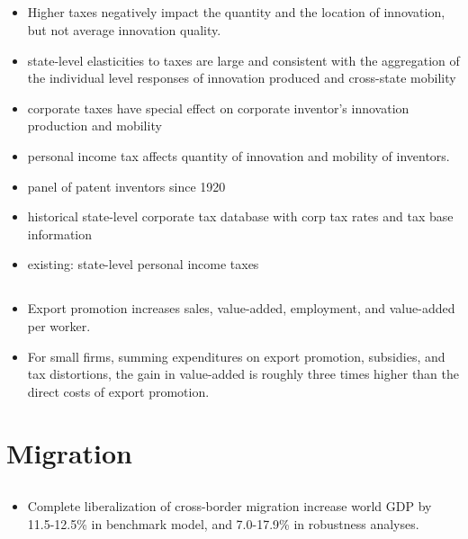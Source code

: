 \documentclass[10pt]{article} %
\begin{document}
    \subsection{\cite{Akcigitetal2018}}
    \begin{itemize}
        \item Higher taxes negatively impact the quantity and the location of innovation, but not average innovation quality.
        \item state-level elasticities to taxes are large and consistent with the aggregation of the individual level responses of innovation produced and cross-state mobility
        \item corporate taxes have special effect on corporate inventor's innovation production and mobility
        \item personal income tax affects quantity of innovation and mobility of inventors.
        \item panel of patent inventors since 1920
        \item historical state-level corporate tax database with corp tax rates and tax base information
        \item existing: state-level personal income taxes
    \end{itemize}

    \subsection{\cite{MunchuSchaur2018}}
    \begin{itemize}
        \item Export promotion increases sales, value-added, employment, and value-added per worker.
        \item For small firms, summing expenditures on export promotion, subsidies, and tax distortions, the gain in value-added is roughly three times higher than the direct costs of export promotion.
    \end{itemize}

\section{Migration}
    \subsection{\cite{DocquierMachadoSekkat2015}}
    \begin{itemize}
        \item Complete liberalization of cross-border migration increase world GDP by 11.5-12.5\% in benchmark model, and 7.0-17.9\% in robustness analyses.
    \end{itemize}
\end{document}
